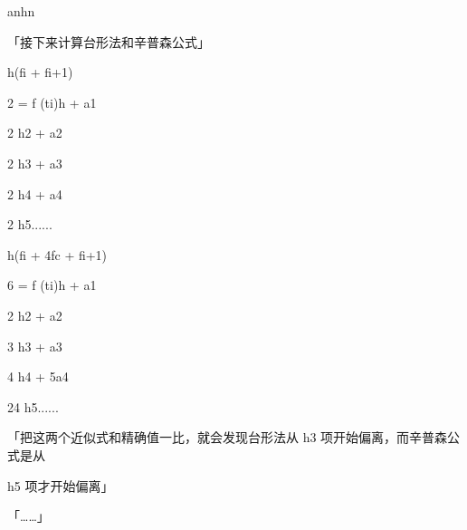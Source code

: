 anhn\par
「接下来计算台形法和辛普森公式」\par
h(fi + fi+1)\par
2 = f (ti)h + a1\par
2 h2 + a2\par
2 h3 + a3\par
2 h4 + a4\par
2 h5......\par
h(fi + 4fc + fi+1)\par
6 = f (ti)h + a1\par
2 h2 + a2\par
3 h3 + a3\par
4 h4 + 5a4\par
24 h5......\par
「把这两个近似式和精确值一比，就会发现台形法从 h3 项开始偏离，而辛普森公式是从\par
h5 项才开始偏离」\par
「……」\par

